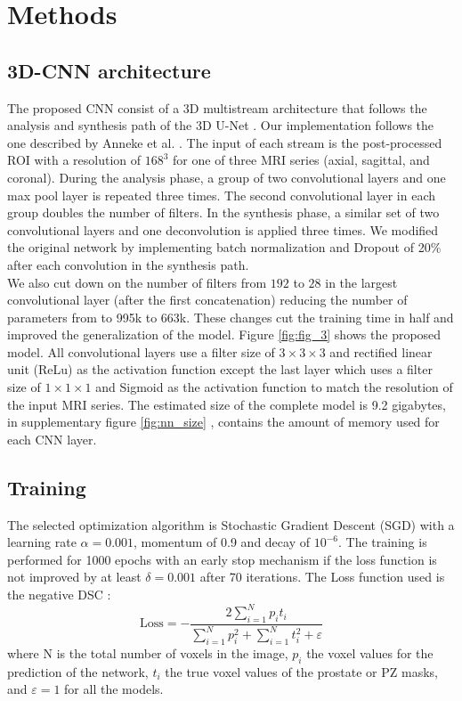 \section{Methods}
\label{sec:methods}




\subsection{3D-CNN architecture}
The proposed CNN consist of a 3D multistream architecture that follows the analysis and synthesis path of the 3D U-Net \cite{cciccek20163d}. Our implementation follows the one described by Anneke et al. \cite{anneke}. The input of each stream is the post-processed ROI with a resolution of $168^3$ for one of three MRI series (axial, sagittal, and coronal). During the analysis phase, a group of two convolutional layers and one max pool layer is repeated three times. The second convolutional layer in each group doubles the number of filters.  In the synthesis phase, a similar set of two convolutional layers and one deconvolution is applied three times. We modified the original network by implementing batch normalization \cite{ioffe2015batch} and Dropout of 20\%  \cite{hinton2012improving} after each convolution in the synthesis path.\\

We also cut down on the number of filters from $192$ to $28$ in the largest convolutional layer (after the first concatenation) reducing the number of parameters from to 995k to 663k. These changes cut the training time in half and improved the generalization of the  model. Figure \ref{fig:fig_3} shows the proposed model. All convolutional layers use a filter size of $3 \times 3 \times 3$ and rectified linear unit (ReLu) as the activation function except the last layer which uses a filter size of $1 \times 1 \times 1$ and Sigmoid as the activation function to match the resolution of the input MRI series. The estimated size of the complete model is 9.2 gigabytes, in supplementary figure \ref{fig:nn_size} , contains the amount of memory used for each CNN layer. 

\subsection{Training}
\label{subsec:training}
The selected optimization algorithm is Stochastic Gradient Descent (SGD) with a learning rate $\alpha = 0.001$, momentum of 0.9 and decay of $10^{-6}$. The training is performed for 1000 epochs with an early stop mechanism if the loss function is not improved by at least $\delta = 0.001$ after 70 iterations. The Loss function used is the negative DSC \cite{dice1945measures}:  
\begin{equation}
\text{Loss} = - \frac{2 \sum_{i=1}^{N}p_it_i}{\sum_{i=1}^{N}p_i^2 + \sum_{i=1}^{N}t_i^2 + \varepsilon} 
\label{eq:dsc}
\end{equation}
where N is the total number of voxels in the image, $p_i$ the voxel values for the prediction of the network, $t_i$ the true voxel values of the prostate or PZ masks, and $\varepsilon = 1$ for all the models.

